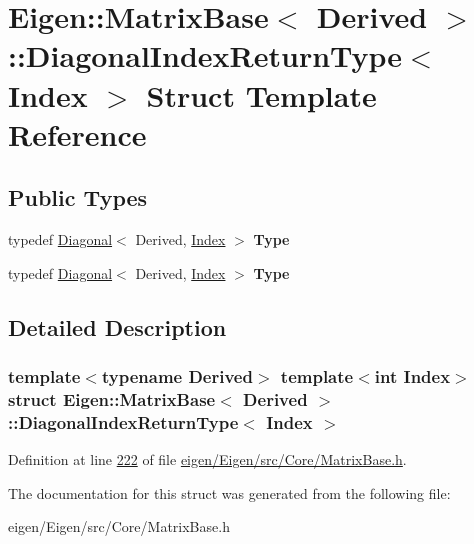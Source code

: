 \hypertarget{struct_eigen_1_1_matrix_base_1_1_diagonal_index_return_type}{}\section{Eigen\+:\+:Matrix\+Base$<$ Derived $>$\+:\+:Diagonal\+Index\+Return\+Type$<$ Index $>$ Struct Template Reference}
\label{struct_eigen_1_1_matrix_base_1_1_diagonal_index_return_type}
\subsection*{Public Types}
\begin{DoxyCompactItemize}
\item 
\mbox{\label{struct_eigen_1_1_matrix_base_1_1_diagonal_index_return_type_a4c66b5491a63942f06d1c0edebc8e390}} 
typedef \hyperlink{group___core___module_class_eigen_1_1_diagonal}{Diagonal}$<$ Derived, \hyperlink{namespace_eigen_a62e77e0933482dafde8fe197d9a2cfde}{Index} $>$ {\bfseries Type}
\item 
\mbox{\label{struct_eigen_1_1_matrix_base_1_1_diagonal_index_return_type_a4c66b5491a63942f06d1c0edebc8e390}} 
typedef \hyperlink{group___core___module_class_eigen_1_1_diagonal}{Diagonal}$<$ Derived, \hyperlink{namespace_eigen_a62e77e0933482dafde8fe197d9a2cfde}{Index} $>$ {\bfseries Type}
\end{DoxyCompactItemize}


\subsection{Detailed Description}
\subsubsection*{template$<$typename Derived$>$\newline
template$<$int Index$>$\newline
struct Eigen\+::\+Matrix\+Base$<$ Derived $>$\+::\+Diagonal\+Index\+Return\+Type$<$ Index $>$}



Definition at line \hyperlink{eigen_2_eigen_2src_2_core_2_matrix_base_8h_source_l00222}{222} of file \hyperlink{eigen_2_eigen_2src_2_core_2_matrix_base_8h_source}{eigen/\+Eigen/src/\+Core/\+Matrix\+Base.\+h}.



The documentation for this struct was generated from the following file\+:\begin{DoxyCompactItemize}
\item 
eigen/\+Eigen/src/\+Core/\+Matrix\+Base.\+h\end{DoxyCompactItemize}
